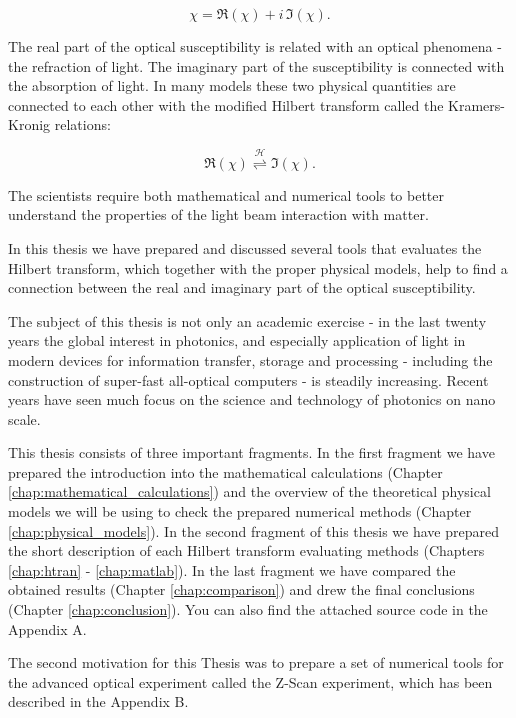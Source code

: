\documentclass[12pt,twoside,a4paper]{article}
\numberwithin{equation}{subsection}
\numberwithin{figure}{subsection}
\begin{document}
\begin{equation} \label{eq:pra_susceptibility}
	\chi = \Re (\chi) + i \, \Im (\chi) . 
\end{equation}

The real part of the optical susceptibility is related with an optical phenomena - the refraction of light. The imaginary part of the susceptibility is connected with the absorption of light. In many models these two physical quantities are connected to each other with the modified Hilbert transform called the Kramers-Kronig relations:


\begin{equation} \label{eq:pra_hilbert_connection} 
	 \Re (\chi)  \overset{\mathcal{H}}{\rightleftharpoons} \Im (\chi) .
\end{equation}

The scientists require both mathematical and numerical tools to better understand the properties of the light beam interaction with matter. 

In this thesis we have prepared and discussed several tools that evaluates the Hilbert transform, which together with the proper physical models, help to find a connection between the real and imaginary part of the optical susceptibility.   

The subject of this thesis is not only an academic exercise - in the last twenty years the global interest in photonics, and especially application of light in modern devices for information transfer, storage and processing - including the construction of super-fast all-optical computers - is steadily increasing. Recent years have seen much focus on the science and technology of photonics on nano scale. 

This thesis consists of three important fragments. In the first fragment we have prepared the introduction into the mathematical calculations (Chapter \ref{chap:mathematical_calculations}) and the overview of the theoretical physical models we will be using to check the prepared numerical methods (Chapter \ref{chap:physical_models}). In the second fragment of this thesis we have prepared the short description of each Hilbert transform evaluating methods (Chapters \ref{chap:htran} - \ref{chap:matlab}). In the last fragment we have compared the obtained results (Chapter \ref{chap:comparison}) and drew the final conclusions (Chapter \ref{chap:conclusion}). You can also find the attached source code in the Appendix A.

The second motivation for this Thesis was to prepare a set of numerical tools for the advanced optical experiment called the Z-Scan experiment, which has been described in the Appendix B.
\end{document}
